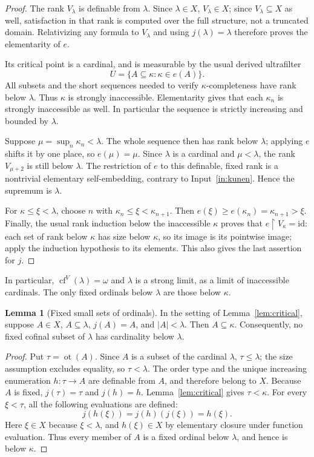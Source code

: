 \documentclass[11pt,letterpaper]{article}
\theoremstyle{definition}
\newtheorem{lemma}[definition]{Lemma}
\newcommand{\cf}{\operatorname{cf}}
\newcommand{\ot}{\operatorname{ot}}
\newcommand{\id}{\mathrm{id}}
\newcommand{\restr}{\mathbin{\upharpoonright}}
\numberwithin{equation}{section}
\begin{document}
\begin{proof}
The rank $V_\lambda$ is definable from $\lambda$. Since $\lambda\in X$,
$V_\lambda\in X$; since $V_\lambda\subseteq X$ as well, satisfaction in that
rank is computed over the full structure, not a truncated domain. Relativizing
any formula to $V_\lambda$ and using $j(\lambda)=\lambda$ therefore proves the
elementarity of $e$.

Its critical point is a cardinal, and is measurable by the usual derived
ultrafilter
\[
 U=\{A\subseteq\kappa:\kappa\in e(A)\}.
\]
All subsets and the short sequences needed to verify $\kappa$-completeness have
rank below $\lambda$. Thus $\kappa$ is strongly inaccessible. Elementarity gives
that each $\kappa_n$ is strongly inaccessible as well. In particular the
sequence is strictly increasing and bounded by $\lambda$.

Suppose $\mu=\sup_n\kappa_n<\lambda$. The whole sequence then has rank below
$\lambda$; applying $e$ shifts it by one place, so $e(\mu)=\mu$. Since $\lambda$
is a cardinal and $\mu<\lambda$, the rank $V_{\mu+2}$ is still below $\lambda$.
The restriction of $e$ to this definable, fixed rank is a nontrivial elementary
self-embedding, contrary to Input~\ref{in:kunen}. Hence the supremum is
$\lambda$.

For $\kappa\le\xi<\lambda$, choose $n$ with
$\kappa_n\le\xi<\kappa_{n+1}$. Then
$e(\xi)\ge e(\kappa_n)=\kappa_{n+1}>\xi$.
Finally, the usual rank induction below the inaccessible $\kappa$ proves that
$e\restr V_\kappa=\id$: each set of rank below $\kappa$ has size below
$\kappa$, so its image is its pointwise image; apply the induction hypothesis
to its elements. This also gives the last assertion for $j$.
\end{proof}

In particular, $\cf^V(\lambda)=\omega$ and $\lambda$ is a strong limit, as a
limit of inaccessible cardinals. The only fixed ordinals below $\lambda$ are
those below $\kappa$.

\begin{lemma}[Fixed small sets of ordinals]\label{lem:fixed-ordinals}
In the setting of Lemma~\ref{lem:critical}, suppose $A\in X$,
$A\subseteq\lambda$, $j(A)=A$, and $|A|<\lambda$. Then $A\subseteq\kappa$.
Consequently, no fixed cofinal subset of $\lambda$ has cardinality below
$\lambda$.
\end{lemma}

\begin{proof}
Put $\tau=\ot(A)$. Since $A$ is a subset of the cardinal $\lambda$,
$\tau\le\lambda$; the size assumption excludes equality, so $\tau<\lambda$.
The order type and the unique increasing enumeration $h:\tau\to A$ are
definable from $A$, and therefore belong to $X$. Because $A$ is fixed,
$j(\tau)=\tau$ and $j(h)=h$. Lemma~\ref{lem:critical} gives $\tau<\kappa$.
For every $\xi<\tau$, all the following evaluations are defined:
\[
 j(h(\xi))=j(h)(j(\xi))=h(\xi).
\]
Here $\xi\in X$ because $\xi<\lambda$, and $h(\xi)\in X$ by elementary
closure under function evaluation. Thus every member of $A$ is a fixed
ordinal below $\lambda$, and hence is below $\kappa$.
\end{proof}
\end{document}
